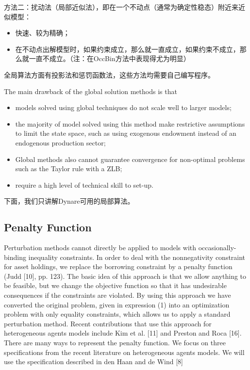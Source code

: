 \documentclass[cn,10pt,math=newtx,citestyle=gb7714-2015,bibstyle=gb7714-2015]{elegantbook}
\begin{document}
方法二：扰动法（局部近似法），即在一个不动点（通常为确定性稳态）附近来近似模型：
\begin{itemize}
	\item 快速、较为精确；
	
	\item 在不动点出解模型时，如果约束成立，那么就一直成立，如果约束不成立，那么就一直不成立。（注：在OccBin方法中表现得尤为明显）
\end{itemize}


全局算法方面有投影法和惩罚函数法，这些方法均需要自己编写程序。

The main drawback of the global solution methods is that

\begin{itemize}
	\item models solved using global techniques do not scale well to larger models;
	\item the majority of model solved using this method make restrictive assumptions to limit the state space, such as using exogenous endowment instead of an endogenous production sector;
	\item Global methods also cannot guarantee convergence for non-optimal problems such as the Taylor rule with a ZLB;
	\item require a high level of technical skill to set-up.
\end{itemize}


下面，我们只讲解Dynare可用的局部算法。
\subsection{Penalty Function}
Perturbation methods cannot directly be applied to models
with occasionally-binding inequality constraints. In order to deal with the nonnegativity
constraint for asset holdings, we replace the borrowing constraint by a
penalty function (Judd [10], pp. 123). The basic idea of this approach is that we
allow anything to be feasible, but we change the objective function so that it has
undesirable consequences if the constraints are violated. By using this approach
we have converted the original problem, given in expression (1) into an optimization
problem with only equality constraints, which allows us to apply a standard
perturbation method. Recent contributions that use this approach for heterogeneous
agents models include Kim et al. [11] and Preston and Roca [16]. There are
many ways to represent the penalty function. We focus on three specifications from
the recent literature on heterogeneous agents models. We will use the specification
described in den Haan and de Wind [8]
\end{document}
